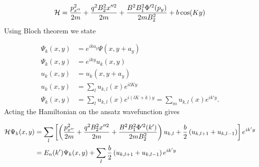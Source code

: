 \begin{align}
  \mathcal{H} = \dfrac{p_{x''}^2}{2m} + \dfrac{q^2B_2^2x''^2}{2m} + \dfrac{B^2 B_1^2 \Phi'^2(p_y) }{2mB_2^2} + b\cos(Ky)
\end{align}
Using Bloch theorem we state

\begin{align}
  \Psi_k (x,y) &= e^{ika_y}\Psi(x,y+a_y) \nonumber \\
  \Psi_k (x,y) &= e^{iky} u_k(x,y) \nonumber \\
  u_k(x,y) &= u_k(x,y+a_y) \nonumber \\
  u_k(x,y) &= \sum_l u_{k,l}(x) e^{ilKy} \nonumber \\
  \Psi_k (x,y) &= \sum_l u_{k,l}(x) e^{i(lK+k)y} = \sum_m u_{k,l}(x) e^{ik'y}.
\end{align}
Acting the Hamiltonian on the ansatz wavefunction gives

\begin{align}
  \mathcal{H}\Psi_k(x,y) &= \sum_l \left[ \left( \dfrac{p_{x''}^2}{2m} + \dfrac{q^2B_2^2x''^2}{2m} + \dfrac{B^2 B_1^2 \Phi'^2(k') }{2mB_2^2}\right) u_{k,l} + \dfrac{b}{2} \left(u_{k,l+1} + u_{k,l-1} \right) \right] e^{ik'y} \nonumber \\
  &= E_n(k')\Psi_k(x,y) + \sum_l \dfrac{b}{2} \left( u_{k,l+1} + u_{k,l-1} \right) e^{ik'y}
\end{align}
